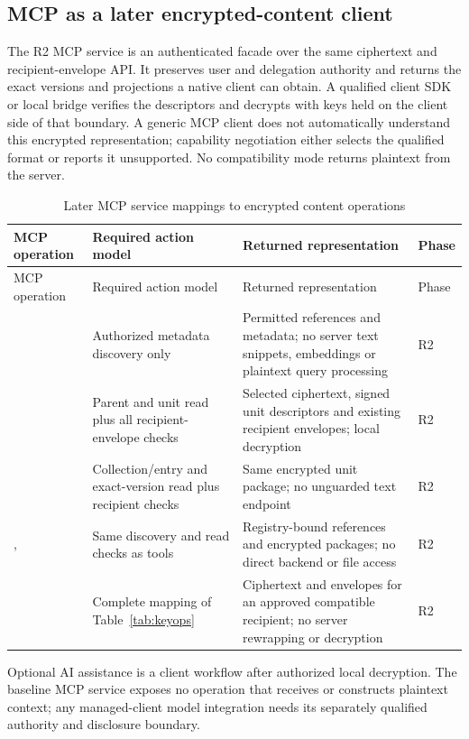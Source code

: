 \subsection{MCP as a later encrypted-content client}
The R2 MCP service is an authenticated facade over the same ciphertext and recipient-envelope API. It preserves user and delegation authority and returns the exact versions and projections a native client can obtain. A qualified client SDK or local bridge verifies the descriptors and decrypts with keys held on the client side of that boundary. A generic MCP client does not automatically understand this encrypted representation; capability negotiation either selects the qualified format or reports it unsupported. No compatibility mode returns plaintext from the server.
\begin{longtable}{@{}P{0.22\textwidth}P{0.27\textwidth}P{0.32\textwidth}P{0.08\textwidth}@{}}
\caption{Later MCP service mappings to encrypted content operations}\label{tab:mcpops}\\
\toprule MCP operation & Required action model & Returned representation & Phase\\\midrule\endfirsthead
\toprule MCP operation & Required action model & Returned representation & Phase\\\midrule\endhead
{} & Authorized metadata discovery only & Permitted references and metadata; no server text snippets, embeddings or plaintext query processing & R2\\
 & Parent and unit read plus all recipient-envelope checks & Selected ciphertext, signed unit descriptors and existing recipient envelopes; local decryption & R2\\
 & Collection/entry and exact-version read plus recipient checks & Same encrypted unit package; no unguarded text endpoint & R2\\
,  & Same discovery and read checks as tools & Registry-bound references and encrypted packages; no direct backend or file access & R2\\
 & Complete mapping of Table~\ref{tab:keyops} & Ciphertext and envelopes for an approved compatible recipient; no server rewrapping or decryption & R2\\
\bottomrule
\end{longtable}
Optional AI assistance is a client workflow after authorized local decryption. The baseline MCP service exposes no  operation that receives or constructs plaintext context; any managed-client model integration needs its separately qualified authority and disclosure boundary.

